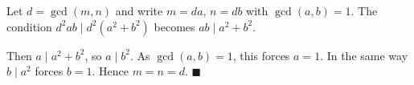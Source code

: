 Let $d=\gcd(m,n)$ and write $m=da$, $n=db$ with $\gcd(a,b)=1$. The condition $d^2ab\mid d^2(a^2+b^2)$ becomes $ab\mid a^2+b^2$.

Then $a\mid a^2+b^2$, so $a\mid b^2$. As $\gcd(a,b)=1$, this forces $a=1$. In the same way $b\mid a^2$ forces $b=1$. Hence $m=n=d$. $\blacksquare$

